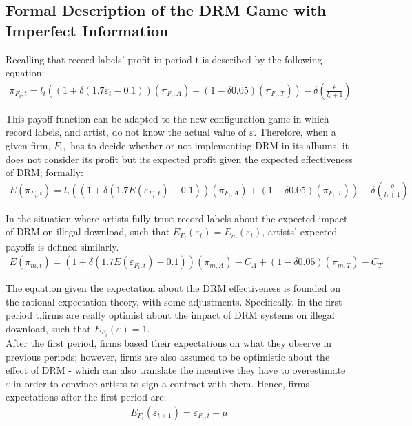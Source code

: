 \documentclass[letter,12pt]{article}
\numberwithin{equation}{section}
\begin{document}
\pagebreak

\subsection{Formal Description of the DRM Game with\\
Imperfect Information} \label{Sec:FullGuessingGame}

Recalling that record labels' profit in period t is described by the
following equation:
\begin{eqnarray*}
\pi_{F_{i},t}=l_{i}((1+\delta(1.7\varepsilon_{t}-0.1))(\pi_{F_{i},A})+(1-\delta0.05)(\pi_{F_{i},T}))-\delta(\frac{\rho}{l_{i}+1})
\end{eqnarray*}

This payoff function can be adapted to the new configuration game
in which record labels, and artist, do not know the actual value of
$\varepsilon$. Therefore, when a given firm, $F_{i},$ has to decide
whether or not implementing DRM in its albums, it does not consider
its profit but its expected profit given the expected effectiveness
of DRM; formally:
\begin{eqnarray*}
E(\pi_{F_{i},t})=l_{i}((1+\delta(1.7E(\varepsilon_{F_{i},t})-0.1))(\pi_{F_{i},A})+(1-\delta0.05)(\pi_{F_{i},T}))-\delta(\frac{\rho}{l_{i}+1})
\end{eqnarray*}

In the situation where artists fully trust record labels about the
expected impact of DRM on illegal download, such that $E_{F_{i}}(\varepsilon_{t})=E_{m}(\varepsilon_{t})$, artists' expected payoffs is defined similarly.
\begin{eqnarray*}
E(\pi_{m,t})=(1+\delta(1.7E(\varepsilon_{F_{i},t})-0.1))(\pi_{m,A})-C_{A}+(1-\delta0.05)(\pi_{m,T})-C_{T}
\end{eqnarray*}

The equation given the expectation about the DRM effectiveness is
founded on the rational expectation theory, with some adjustments.
Specifically, in the first period t,firms are really optimist about
the impact of DRM systems on illegal download, such that $E_{F_i}(\varepsilon)=1$.\\

After the first period, firms based their expectations on what they
observe in previous periods; however, firms are also assumed to be
optimistic about the effect of DRM - which can also translate the incentive
they have to overestimate $\varepsilon$ in order to convince artists
to sign a contract with them. Hence, firms' expectations after the
first period are:
\begin{eqnarray*}
E_{F_{i}}(\varepsilon_{t+1})=\varepsilon_{F_{i},t} + \mu
\end{eqnarray*}
\end{document}
